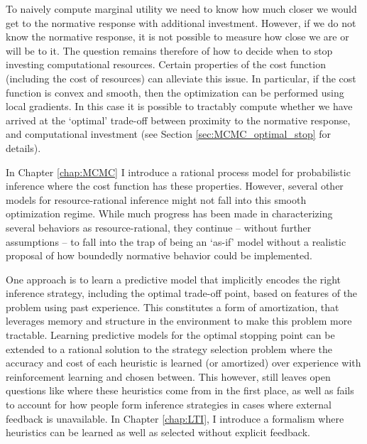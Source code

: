 To naively compute marginal utility we need to know how much closer we would get to the normative response with additional investment. However, if we do not know the normative response, it is not possible to measure how close we are or will be to it. The question remains therefore of how to decide when to stop investing computational resources. Certain properties of the cost function (including the cost of resources) can alleviate this issue. In particular, if the cost function is convex and smooth, then the optimization can be performed using local gradients. In this case it is possible to tractably compute whether we have arrived at the `optimal' trade-off between proximity to the normative response, and computational investment (see Section \ref{sec:MCMC_optimal_stop} for details).


In Chapter \ref{chap:MCMC} I introduce a rational process model for probabilistic inference where the cost function has these properties. However, several other models for resource-rational inference might not fall into this smooth optimization regime. \citep{horvitz1989reflection, russell1994provably, hay2014selecting} While much progress has been made in characterizing several behaviors as resource-rational, they continue -- without further assumptions -- to fall into the trap of being an `as-if' model without a realistic proposal of how boundedly normative behavior could be implemented. 


One approach is to learn a predictive model that implicitly encodes the right inference strategy, including the optimal trade-off point, based on features of the problem using past experience. This constitutes a form of amortization, that leverages memory and structure in the environment to make this problem more tractable. Learning predictive models for the optimal stopping point can be extended to a rational solution to the strategy selection problem\citep{lieder2017strategy} where the accuracy and cost of each heuristic is learned (or amortized) over experience with reinforcement learning and chosen between. \citep{erev05, rieskamp06} This however, still leaves open questions like where these heuristics come from in the first place, as well as fails to account for how people form inference strategies in cases where external feedback is unavailable. In Chapter \ref{chap:LTI}, I introduce a formalism where heuristics can be learned as well as selected without explicit feedback.

